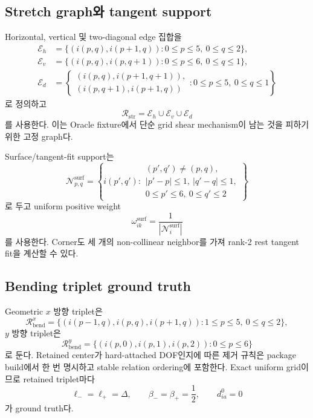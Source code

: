 \documentclass[11pt]{article}
\begin{document}
\subsection{Stretch graph와 tangent support}

Horizontal, vertical 및 two-diagonal edge 집합을
\begin{align}
\mathcal E_h
&=
\{(i(p,q),i(p+1,q)):0\leq p\leq5,\ 0\leq q\leq2\},\\
\mathcal E_v
&=
\{(i(p,q),i(p,q+1)):0\leq p\leq6,\ 0\leq q\leq1\},\\
\mathcal E_d
&=
\left\{
\begin{array}{l}
(i(p,q),i(p+1,q+1)),\\
(i(p,q+1),i(p+1,q))
\end{array}
:0\leq p\leq5,\ 0\leq q\leq1
\right\}
\end{align}
로 정의하고
\begin{equation}
  \mathcal R_{\mathrm{str}}
  =\mathcal E_h\cup\mathcal E_v\cup\mathcal E_d
\end{equation}
를 사용한다. 이는 Oracle fixture에서 단순 grid shear mechanism이 남는 것을 피하기 위한 고정 graph다.

Surface/tangent-fit support는
\begin{equation}
\mathcal N_{p,q}^{\mathrm{surf}}
=
\left\{
  i(p',q'):\begin{array}{l}
  (p',q')\neq(p,q),\\
  |p'-p|\leq1,\ |q'-q|\leq1,\\
  0\leq p'\leq6,\ 0\leq q'\leq2
  \end{array}
\right\}
\end{equation}
로 두고 uniform positive weight
\begin{equation}
  \omega_{ik}^{\mathrm{surf}}
  =
  \frac{1}{|\mathcal N_i^{\mathrm{surf}}|}
\end{equation}
를 사용한다. Corner도 세 개의 non-collinear neighbor를 가져 rank-2 rest tangent fit을 계산할 수 있다.

\subsection{Bending triplet ground truth}

Geometric $x$ 방향 triplet은
\begin{equation}
  \mathcal R_{\mathrm{bend}}^x
  =
  \{(i(p-1,q),i(p,q),i(p+1,q)):1\leq p\leq5,\ 0\leq q\leq2\},
\end{equation}
$y$ 방향 triplet은
\begin{equation}
  \mathcal R_{\mathrm{bend}}^y
  =
  \{(i(p,0),i(p,1),i(p,2)):0\leq p\leq6\}
\end{equation}
로 둔다. Retained center가 hard-attached DOF인지에 따른 제거 규칙은 package build에서 한 번 명시하고
stable relation ordering에 포함한다. Exact uniform grid이므로 retained triplet마다
\begin{equation}
  \ell_- = \ell_+ = \Delta,
  \qquad
  \beta_- = \beta_+ = \frac12,
  \qquad
  d_{ia}^0=0
\end{equation}
가 ground truth다.
\end{document}
